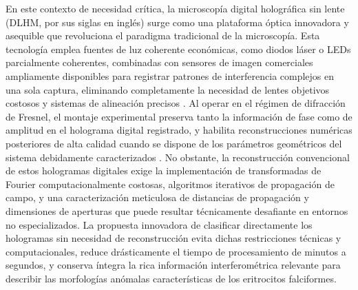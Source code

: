 En este contexto de necesidad crítica, la microscopía digital holográfica sin lente (DLHM, por sus siglas en inglés) surge como una plataforma óptica innovadora y asequible que revoluciona el paradigma tradicional de la microscopía. Esta tecnología emplea fuentes de luz coherente económicas, como diodos láser o LEDs parcialmente coherentes, combinadas con sensores de imagen comerciales ampliamente disponibles para registrar patrones de interferencia complejos en una sola captura, eliminando completamente la necesidad de lentes objetivos costosos y sistemas de alineación precisos \cite{Amann2019,BuitragoDuque2023}. Al operar en el régimen de difracción de Fresnel, el montaje experimental preserva tanto la información de fase como de amplitud en el holograma digital registrado, y habilita reconstrucciones numéricas posteriores de alta calidad cuando se dispone de los parámetros geométricos del sistema debidamente caracterizados \cite{Greenbaum2014,Kim2025}. No obstante, la reconstrucción convencional de estos hologramas digitales exige la implementación de transformadas de Fourier computacionalmente costosas, algoritmos iterativos de propagación de campo, y una caracterización meticulosa de distancias de propagación y dimensiones de aperturas que puede resultar técnicamente desafiante en entornos no especializados. La propuesta innovadora de clasificar directamente los hologramas sin necesidad de reconstrucción evita dichas restricciones técnicas y computacionales, reduce drásticamente el tiempo de procesamiento de minutos a segundos, y conserva íntegra la rica información interferométrica relevante para describir las morfologías anómalas características de los eritrocitos falciformes.


